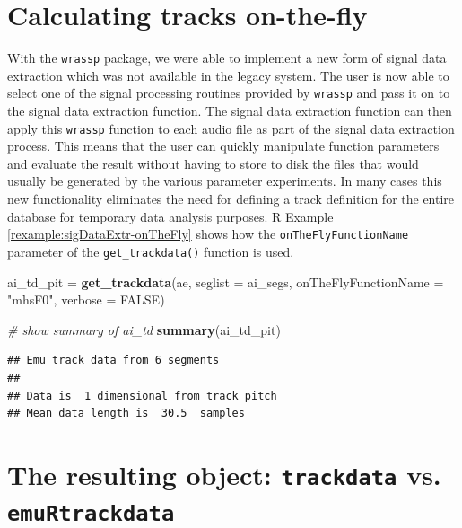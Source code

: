\documentclass[]{book}
\newenvironment{Shaded}{\begin{snugshade}}{\end{snugshade}}
\newcommand{\CommentTok}[1]{\textcolor[rgb]{0.56,0.35,0.01}{\textit{#1}}}
\newcommand{\DataTypeTok}[1]{\textcolor[rgb]{0.13,0.29,0.53}{#1}}
\newcommand{\KeywordTok}[1]{\textcolor[rgb]{0.13,0.29,0.53}{\textbf{#1}}}
\newcommand{\NormalTok}[1]{#1}
\newcommand{\OtherTok}[1]{\textcolor[rgb]{0.56,0.35,0.01}{#1}}
\newcommand{\StringTok}[1]{\textcolor[rgb]{0.31,0.60,0.02}{#1}}
\theoremstyle{definition}
\theoremstyle{definition}
\theoremstyle{definition}
\theoremstyle{remark}
\begin{document}
\hypertarget{calculating-tracks-on-the-fly}{%
\section{Calculating tracks
on-the-fly}\label{calculating-tracks-on-the-fly}}

With the \texttt{wrassp} package, we were able to implement a new form
of signal data extraction which was not available in the legacy system.
The user is now able to select one of the signal processing routines
provided by \texttt{wrassp} and pass it on to the signal data extraction
function. The signal data extraction function can then apply this
\texttt{wrassp} function to each audio file as part of the signal data
extraction process. This means that the user can quickly manipulate
function parameters and evaluate the result without having to store to
disk the files that would usually be generated by the various parameter
experiments. In many cases this new functionality eliminates the need
for defining a track definition for the entire database for temporary
data analysis purposes. R Example \ref{rexample:sigDataExtr-onTheFly}
shows how the \texttt{onTheFlyFunctionName} parameter of the
\texttt{get\_trackdata()} function is used.

\begin{Shaded}
\begin{Highlighting}[]
\NormalTok{ai_td_pit =}\StringTok{ }\KeywordTok{get_trackdata}\NormalTok{(ae,}
                          \DataTypeTok{seglist =}\NormalTok{ ai_segs,}
                          \DataTypeTok{onTheFlyFunctionName =} \StringTok{"mhsF0"}\NormalTok{,}
                          \DataTypeTok{verbose =} \OtherTok{FALSE}\NormalTok{)}

\CommentTok{# show summary of ai_td}
\KeywordTok{summary}\NormalTok{(ai_td_pit)}
\end{Highlighting}
\end{Shaded}

\begin{verbatim}
## Emu track data from 6 segments
## 
## Data is  1 dimensional from track pitch 
## Mean data length is  30.5  samples
\end{verbatim}

\hypertarget{the-resulting-object-trackdata-vs.-emurtrackdata}{%
\section{\texorpdfstring{The resulting object: \texttt{trackdata} vs.
\texttt{emuRtrackdata}}{The resulting object: trackdata vs. emuRtrackdata}}\label{the-resulting-object-trackdata-vs.-emurtrackdata}}
\end{document}
